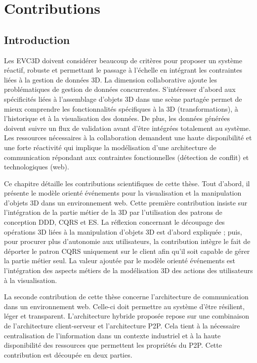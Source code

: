 \chapter{Contributions}
\label{sec:chap:contrib}
\chaptertable
\section{Introduction}
Les \gls{EVC3D} doivent considérer beaucoup de critères pour proposer un 
système réactif, robuste et permettant le passage à l'échelle en intégrant les 
contraintes liées à la gestion de données \gls{3D}. La dimension collaborative 
ajoute les problématiques de gestion de données concurrentes.
S'intéresser d'abord aux spécificités liées à l'assemblage d'objets \gls{3D} dans 
une scène partagée permet de mieux comprendre les fonctionnalités spécifiques à 
la \gls{3D} (transformations), à l'historique et à la visualisation des données. 
De plus, les données générées doivent suivre un flux de validation avant d'être 
intégrées totalement au système.
Les ressources nécessaires à la collaboration demandent une haute disponibilité 
et une forte réactivité qui implique la modélisation d'une architecture 
de communication répondant aux contraintes fonctionnelles (détection de conflit) 
et technologiques (web).

Ce chapitre détaille les contributions scientifiques de cette thèse.
Tout d'abord, il présente le modèle orienté événements pour la visualisation et la 
manipulation d'objets \gls{3D} dans un environnement web. 
Cette première contribution insiste sur l'intégration de la partie métier de la 
\gls{3D} par l'utilisation des patrons de conception \gls{DDD}, \gls{CQRS} et 
\gls{ES}. 
La réflexion concernant le découpage des opérations \gls{3D} liées à la 
manipulation d'objets \gls{3D} est d'abord expliquée ; puis, pour procurer plus 
d'autonomie aux utilisateurs, la contribution intègre le fait de déporter le patron 
\gls{CQRS} uniquement sur le client afin qu'il soit capable de gérer la partie métier 
seul. La valeur ajoutée par le modèle orienté événements est l'intégration des 
aspects métiers de la modélisation 3D des actions des utilisateurs à la 
visualisation. 

La seconde contribution de cette thèse concerne l'architecture de 
communication dans un environnement web. Celle-ci doit permettre au système 
d'être résilient, léger et transparent. 
L'architecture hybride proposée repose sur une combinaison de l'architecture 
client-serveur et l'architecture \gls{P2P}. 
Cela tient à la nécessaire centralisation de l'information dans un contexte industriel 
et à la haute disponibilité des ressources que permettent les propriétés du 
\gls{P2P}. Cette contribution est découpée en deux parties. 

